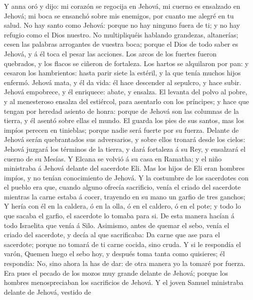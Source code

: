  Y anna oró y dijo: mi corazón se regocija en Jehová, mi
cuerno es ensalzado en Jehová; mi boca se ensanchó sobre mis enemigos,
por cuanto me alegré en tu salud.  No hay santo como Jehová:
porque no hay ninguno fuera de ti; y no hay refugio como el Dios
nuestro.  No multipliquéis hablando grandezas, altanerías;
cesen las palabras arrogantes de vuestra boca; porque el Dios de todo
saber es Jehová, y á él toca el pesar las acciones.  Los
arcos de los fuertes fueron quebrados, y los flacos se ciñeron de
fortaleza.  Los hartos se alquilaron por pan: y cesaron los
hambrientos: hasta parir siete la estéril, y la que tenía muchos hijos
enfermó.  Jehová mata, y él da vida: él hace descender al
sepulcro, y hace subir.  Jehová empobrece, y él enriquece:
abate, y ensalza.  El levanta del polvo al pobre, y al
menesteroso ensalza del estiércol, para asentarlo con los príncipes; y
hace que tengan por heredad asiento de honra: porque de Jehová son las
columnas de la tierra, y él asentó sobre ellas el mundo.  El
guarda los pies de sus santos, mas los impíos perecen en tinieblas;
porque nadie será fuerte por su fuerza.  Delante de Jehová
serán quebrantados sus adversarios, y sobre ellos tronará desde los
cielos: Jehová juzgará los términos de la tierra, y dará fortaleza á su
Rey, y ensalzará el cuerno de su Mesías.  Y Elcana se
volvió á su casa en Ramatha; y el niño ministraba á Jehová delante del
sacerdote Eli.  Mas los hijos de Eli eran hombres impíos, y
no tenían conocimiento de Jehová.  Y la costumbre de los
sacerdotes con el pueblo era que, cuando alguno ofrecía sacrificio,
venía el criado del sacerdote mientras la carne estaba á cocer, trayendo
en su mano un garfio de tres ganchos;  Y hería con él en la
caldera, ó en la olla, ó en el caldero, ó en el pote; y todo lo que
sacaba el garfio, el sacerdote lo tomaba para si. De esta manera hacían
á todo Israelita que venía á Silo.  Asimismo, antes de
quemar el sebo, venía el criado del sacerdote, y decía al que
sacrificaba: Da carne que ase para el sacerdote; porque no tomará de ti
carne cocida, sino cruda.  Y si le respondía el varón,
Quemen luego el sebo hoy, y después toma tanta como quisieres; él
respondía: No, sino ahora la has de dar: de otra manera yo la tomaré por
fuerza.  Era pues el pecado de los mozos muy grande delante
de Jehová; porque los hombres menospreciaban los sacrificios de Jehová.
 Y el joven Samuel ministraba delante de Jehová, vestido de
